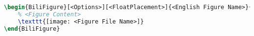 \begin{lstlisting}[language=LaTeX, label=listing:bilingual-figure]
\begin{BiliFigure}[<Options>][<FloatPlacement>]{<English Figure Name>}{<中文图名>}
    % <Figure Content>
    \texttt{[image: <Figure File Name>]}
\end{BiliFigure}
\end{lstlisting}